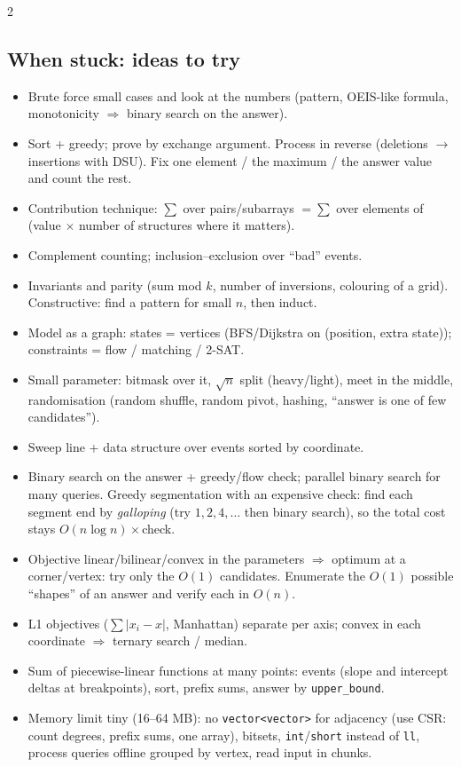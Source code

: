 \documentclass[8pt,a4paper]{extarticle}
\begin{document}
\begin{multicols*}{2}
\subsection{When stuck: ideas to try}
\begin{itemize}
\item Brute force small cases and look at the numbers (pattern, OEIS-like
  formula, monotonicity $\Rightarrow$ binary search on the answer).
\item Sort + greedy; prove by exchange argument. Process in reverse
  (deletions $\to$ insertions with DSU). Fix one element / the maximum /
  the answer value and count the rest.
\item Contribution technique: $\sum$ over pairs/subarrays $=\sum$ over
  elements of (value $\times$ number of structures where it matters).
\item Complement counting; inclusion--exclusion over ``bad'' events.
\item Invariants and parity (sum mod $k$, number of inversions, colouring
  of a grid). Constructive: find a pattern for small $n$, then induct.
\item Model as a graph: states = vertices (BFS/Dijkstra on (position,
  extra state)); constraints = flow / matching / 2-SAT.
\item Small parameter: bitmask over it, $\sqrt{n}$ split (heavy/light),
  meet in the middle, randomisation (random shuffle, random pivot,
  hashing, ``answer is one of few candidates'').
\item Sweep line + data structure over events sorted by coordinate.
\item Binary search on the answer + greedy/flow check; parallel binary
  search for many queries. Greedy segmentation with an expensive check:
  find each segment end by \emph{galloping} (try $1,2,4,\dots$ then binary
  search), so the total cost stays $O(n\log n)\times$check.
\item Objective linear/bilinear/convex in the parameters $\Rightarrow$
  optimum at a corner/vertex: try only the $O(1)$ candidates. Enumerate the
  $O(1)$ possible ``shapes'' of an answer and verify each in $O(n)$.
\item L1 objectives ($\sum |x_i - x|$, Manhattan) separate per axis;
  convex in each coordinate $\Rightarrow$ ternary search / median.
\item Sum of piecewise-linear functions at many points: events
  (slope and intercept deltas at breakpoints), sort, prefix sums,
  answer by \texttt{upper\_bound}.
\item Memory limit tiny (16--64 MB): no \texttt{vector<vector>} for
  adjacency (use CSR: count degrees, prefix sums, one array), bitsets,
  \texttt{int}/\texttt{short} instead of \texttt{ll}, process queries
  offline grouped by vertex, read input in chunks.
\end{itemize}


\end{multicols*}
\end{document}
